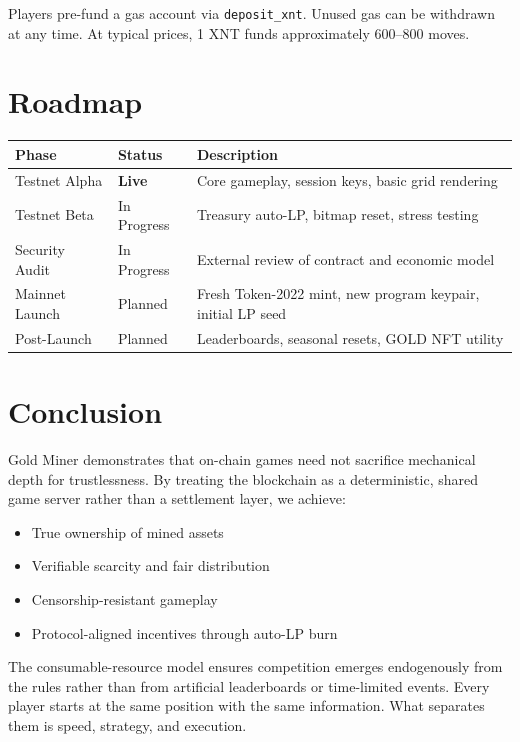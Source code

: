 \documentclass[11pt,a4paper]{article}
\begin{document}
Players pre-fund a gas account via \texttt{deposit\_xnt}. Unused gas can be withdrawn at any time. At typical prices, 1 XNT funds approximately 600--800 moves.

\section{Roadmap}

\begin{table}[h]
\centering
\begin{tabular}{@{}llp{7cm}@{}}
\toprule
Phase & Status & Description \\
\midrule
Testnet Alpha & \textbf{Live} & Core gameplay, session keys, basic grid rendering \\
Testnet Beta & In Progress & Treasury auto-LP, bitmap reset, stress testing \\
Security Audit & In Progress & External review of contract and economic model \\
Mainnet Launch & Planned & Fresh Token-2022 mint, new program keypair, initial LP seed \\
Post-Launch & Planned & Leaderboards, seasonal resets, GOLD NFT utility \\
\bottomrule
\end{tabular}
\end{table}

\section{Conclusion}

Gold Miner demonstrates that on-chain games need not sacrifice mechanical depth for trustlessness. By treating the blockchain as a deterministic, shared game server rather than a settlement layer, we achieve:

\begin{itemize}[leftmargin=2em]
\item True ownership of mined assets
\item Verifiable scarcity and fair distribution
\item Censorship-resistant gameplay
\item Protocol-aligned incentives through auto-LP burn
\end{itemize}

The consumable-resource model ensures competition emerges endogenously from the rules rather than from artificial leaderboards or time-limited events. Every player starts at the same position with the same information. What separates them is speed, strategy, and execution.
\end{document}
